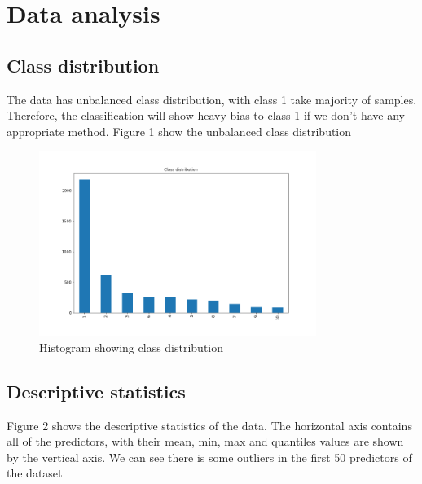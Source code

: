 \documentclass[journal,twocolumn,letterpaper]{IEEEJERM}
\begin{document}

\section{Data analysis}
\subsection{Class distribution}
\noindent The data has unbalanced class distribution, with class 1 take majority of samples. Therefore, the classification will show heavy bias to class 1 if we don't have any appropriate method. Figure 1 show the unbalanced class distribution

\begin{figure}[!t]
\centering
\includegraphics[height = 6cm]{classdistribution.png}
\caption{Histogram showing class distribution}
\label{fig_sim1}
\end{figure}

\subsection{Descriptive statistics}


Figure 2 shows the descriptive statistics of the data. The horizontal axis contains all of the predictors, with their mean, min, max and quantiles values are shown by the vertical axis. We can see there is some outliers in the first 50 predictors of the dataset
\end{document}
